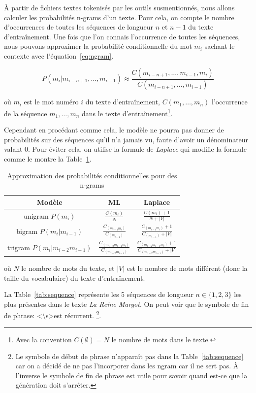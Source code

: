 \documentclass[a4paper]{article}
\begin{document}
À partir de fichiers textes tokenisés par les outils susmentionnés, nous allons calculer les probabilités n-grams d'un texte. Pour cela, on compte le nombre d'occurrences de toutes les séquences de longueur $n$ et $n-1$ du texte d'entraînement. Une fois que l'on 
connais l'occurrence de toutes les séquences, nous pouvons approximer la probabilité conditionnelle du mot $m_i$ sachant le contexte avec
l'équation~\ref{eq:ngram}.

\begin{equation}
    P(m_i|m_{i-n+1},\dots,m_{i-1}) \approx \frac{C(m_{i-n+1},\dots,m_{i-1},m_i)}{C(m_{i-n+1},\dots,m_{i-1})}
    \label{eq:ngram}
\end{equation}

où $m_i$ est le mot numéro $i$ du texte d'entraînement, $C(m_1,\dots,m_n)$ l'occurrence de la séquence $m_1,\dots,m_n$ dans le texte
d'entraînement\footnote{Avec la convention $C(\emptyset) = N$  le nombre de mots dans le texte.}. 

Cependant en procédant comme cela, le modèle ne pourra pas donner de probabilités sur des séquences qu'il n'a jamais vu,
faute d'avoir un dénominateur valant 0. Pour éviter cela, on utilise la formule de \textit{Laplace} qui 
modifie la formule comme le montre la Table~\ref{tab:ngram}.
\begin{table}[ht]
    \centering
    \begin{tabular}{|c|c|c|}
        \hline
        Modèle & ML & Laplace \\
        \hline
        unigram $P(m_i)$ & $\frac{C(m_i)}{N}$ & $\frac{C(m_i)+1}{N+|V|}$ \\
        \hline
        bigram $P(m_i|m_{i-1})$ & $\frac{C_(m_{i-1}m_i)}{C_(m_{i-1})}$ & $\frac{C_(m_{i-1}m_i)+1}{C_(m_{i-1})+|V|}$ \\
        \hline
        trigram $P(m_i|m_{i-2}m_{i-1})$ & $\frac{C_(m_{i-2}m_{i-1}m_i)}{C_(m_{i-2}m_{i-1})}$ & $\frac{C_(m_{i-2}m_{i-1}m_i)+1}{C_(m_{i-2}m_{i-1})+|V|}$ \\
        \hline
    \end{tabular}
    \caption{Approximation des probabilités conditionnelles pour des n-grams}
    \label{tab:ngram} 
\end{table}

où $N$ le nombre de mots du texte, et $|V|$ est le nombre de mots différent (donc la taille du vocabulaire) du texte d'entraînement. 

La Table~\ref{tab:sequence} représente les 5 séquences de longueur $n \in \{1, 2, 3\}$ les plus présentes dans le texte \textit{La Reine Margot}. On peut voir que le symbole de fin de phrase: \textless \textbackslash s\textgreater est récurrent. \footnote{Le symbole de début de phrase n'apparaît pas dans la Table~\ref{tab:sequence} car on a décidé de ne pas l'incorporer dans les ngram car il ne sert pas. À l'inverse le symbole de fin de phrase est utile pour savoir quand est-ce que la génération doit s'arrêter.}.
\end{document}
